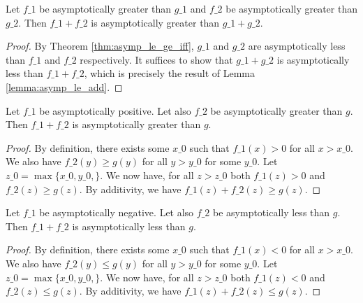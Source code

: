 \begin{lemma}
    \label{lemma:asymp_ge_add}
    \leanok
    Let $f\_1$ be asymptotically greater than $g\_1$ and $f\_2$ be asymptotically greater
    than $g\_2$. Then $f\_1 + f\_2$ is asymptotically greater than $g\_1 + g\_2$.
\end{lemma}

\begin{proof}
    \leanok
    By Theorem \ref{thm:asymp_le_ge_iff}, $g\_1$ and $g\_2$ are asymptotically less 
    than $f\_1$ and $f\_2$ respectively. It suffices to show that $g\_1 + g\_2$ is
    asymptotically less than $f\_1 + f\_2$, which is precisely the result of
    Lemma \ref{lemma:asymp_le_add}.
\end{proof}

\begin{lemma}
    \label{lemma:asymp_ge_add_pos}
    \leanok
    Let $f\_1$ be asymptotically positive. Let also $f\_2$ be asymptotically greater 
    than $g$. Then $f\_1 + f\_2$ is asymptotically greater than $g$.
\end{lemma}

\begin{proof}
    \leanok
    By definition, there exists some $x\_0$ such that $f\_1(x) > 0$ for all $x > x\_0$.
    We also have $f\_2(y) \ge g(y)$ for all $y > y\_0$ for some $y\_0$. Let
    $z\_0 = \max \{ x\_0, y\_0, \}$. We now have, for all $z > z\_0$ both $f\_1(z) > 0$
    and $f\_2(z) \ge g(z)$. By additivity, we have $f\_1(z) + f\_2(z) \ge g(z)$. 
\end{proof}

\begin{lemma}
    \label{lemma:asymp_le_add_neg}
    \leanok
    Let $f\_1$ be asymptotically negative. Let also $f\_2$ be asymptotically less 
    than $g$. Then $f\_1 + f\_2$ is asymptotically less than $g$.
\end{lemma}

\begin{proof}
    \leanok
    By definition, there exists some $x\_0$ such that $f\_1(x) < 0$ for all $x > x\_0$.
    We also have $f\_2(y) \le g(y)$ for all $y > y\_0$ for some $y\_0$. Let
    $z\_0 = \max \{ x\_0, y\_0, \}$. We now have, for all $z > z\_0$ both $f\_1(z) < 0$
    and $f\_2(z) \le g(z)$. By additivity, we have $f\_1(z) + f\_2(z) \le g(z)$. 
\end{proof}


